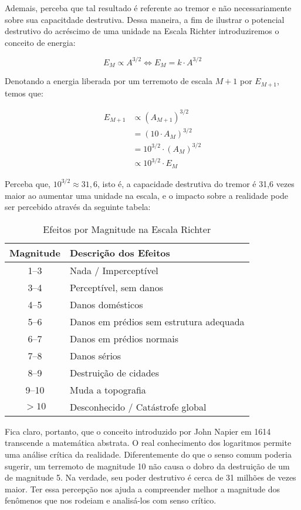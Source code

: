 Ademais, perceba que tal resultado é referente ao tremor e não necessariamente sobre sua capacitdade destrutiva. Dessa maneira, a fim de ilustrar o potencial destrutivo do acréscimo de uma unidade na Escala Richter introduziremos o conceito de energia:

\begin{equation*}
    E_M \propto A^{3/2} \iff E_M = k \cdot A^{3/2}
\end{equation*}

Denotando a energia liberada por um terremoto de escala $M+1$ por $E_{M+1}$, temos que:

\begin{align*}
    E_{M+1} &\propto (A_{M+1})^{3/2} \\
            &= (10 \cdot A_M)^{3/2} \\
            &= 10^{3/2} \cdot (A_M)^{3/2} \\
            &\propto 10^{3/2} \cdot E_M
\end{align*}

Perceba que, $10^{3/2} \approx 31,6$, isto é, a capacidade destrutiva do tremor é 31,6 vezes maior ao aumentar uma unidade na escala, e o impacto sobre a realidade pode ser percebido através da seguinte tabela:

\begin{table}[H]
\centering
\label{tab:richter_simples}
\begin{tabular}{|c|l|}
    \hline
\textbf{Magnitude} & \textbf{Descrição dos Efeitos} \\
\hline
1--3 & Nada / Imperceptível \\
3--4 & Perceptível, sem danos \\
4--5 & Danos domésticos \\
5--6 & Danos em prédios sem estrutura adequada \\
6--7 & Danos em prédios normais \\
7--8 & Danos sérios \\
8--9 & Destruição de cidades \\
9--10 & Muda a topografia \\
$>10$ & Desconhecido / Catástrofe global \\
\hline
\end{tabular}
\caption{Efeitos por Magnitude na Escala Richter}
\end{table}



Fica claro, portanto, que o conceito introduzido por John Napier em 1614 transcende a matemática abstrata. O real conhecimento dos logaritmos permite uma análise crítica da realidade. Diferentemente do que o senso comum poderia sugerir, um terremoto de magnitude 10 não causa o dobro da destruição de um de magnitude 5. Na verdade, seu poder destrutivo é cerca de 31 milhões de vezes maior. Ter essa percepção nos ajuda a compreender melhor a magnitude dos fenômenos que nos rodeiam e analisá-los com senso crítico.
